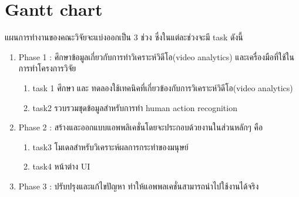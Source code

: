 \section{Gantt chart}แผนการทำงานของคณะวิจัยจะแบ่งออกเป็น 3 ช่วง ซึ่งในแต่ละช่วงจะมี task ดังนี้
\begin{enumerate}
	\item Phase 1 :  ศึกษาข้อมูลเกี่ยวกับการทำวิเคราะห์วิดีโอ(video analytics) และเครื่องมือที่ใช้ในการทำโครงการวิจัย
		\begin{enumerate}\setlength\itemsep{-0.25em}
			\item task 1 	ศึกษา และ ทดลองใช้เทคนิคที่เกี่ยวข้องกับการวิเคราะห์วิดีโอ(video analytics)
			\item task2	รวบรวมชุดข้อมูลสำหรับการทำ human action recognition
		\end{enumerate}
	\item Phase 2 :  สร้างและออกแบบแอพพลิเคชั่นโดยจะประกอบด้วยงานในส่วนหลักๆ คือ
		\begin{enumerate}\setlength\itemsep{-0.25em}
			\item task3	โมเดลสำหรับวิเคราะห์ผลการกระทำของมนุษย์
			\item task4	หน้าต่าง UI
		\end{enumerate}
	\item Phase 3 : ปรับปรุงและแก้ไขปัญหา ทำให้แอพพลเคชั่นสามารถนำไปใช้งานได้จริง
\end{enumerate}

